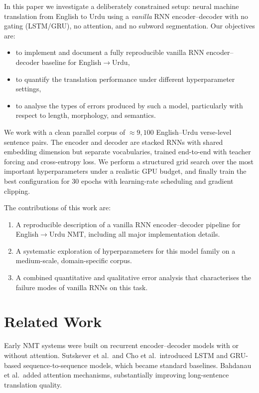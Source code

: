 \documentclass[runningheads]{llncs}
\begin{document}
In this paper we investigate a deliberately constrained setup: neural machine translation from English to Urdu using a \emph{vanilla} RNN encoder--decoder with no gating (LSTM/GRU), no attention, and no subword segmentation.
Our objectives are:
\begin{itemize}
    \item to implement and document a fully reproducible vanilla RNN encoder--decoder baseline for English$\rightarrow$Urdu,
    \item to quantify the translation performance under different hyperparameter settings,
    \item to analyse the types of errors produced by such a model, particularly with respect to length, morphology, and semantics.
\end{itemize}

We work with a clean parallel corpus of \(\approx 9{,}100\) English--Urdu verse-level sentence pairs.
The encoder and decoder are stacked RNNs with shared embedding dimension but separate vocabularies, trained end-to-end with teacher forcing and cross-entropy loss.
We perform a structured grid search over the most important hyperparameters under a realistic GPU budget, and finally train the best configuration for 30 epochs with learning-rate scheduling and gradient clipping.

The contributions of this work are:
\begin{enumerate}
    \item A reproducible description of a vanilla RNN encoder--decoder pipeline for English$\rightarrow$Urdu NMT, including all major implementation details.
    \item A systematic exploration of hyperparameters for this model family on a medium-scale, domain-specific corpus.
    \item A combined quantitative and qualitative error analysis that characterises the failure modes of vanilla RNNs on this task.
\end{enumerate}

\section{Related Work}
Early NMT systems were built on recurrent encoder--decoder models with or without attention.
Sutskever et al.\ and Cho et al.\ introduced LSTM and GRU-based sequence-to-sequence models, which became standard baselines.
Bahdanau et al.\ added attention mechanisms, substantially improving long-sentence translation quality.
\end{document}
